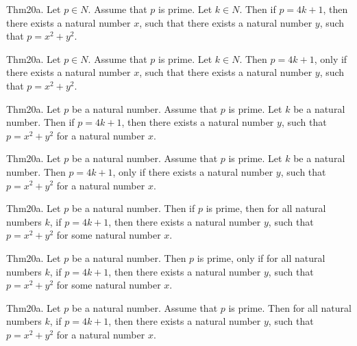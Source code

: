 \documentclass{article}
\begin{document}
Thm20a. Let $p \in N$. Assume that $p$ is prime. Let $k \in N$. Then if $p = 4 k + 1$, then there exists a natural number $x$, such that there exists a natural number $y$, such that $p = x ^{ 2}+ y ^{ 2}$.

Thm20a. Let $p \in N$. Assume that $p$ is prime. Let $k \in N$. Then $p = 4 k + 1$, only if there exists a natural number $x$, such that there exists a natural number $y$, such that $p = x ^{ 2}+ y ^{ 2}$.

Thm20a. Let $p$ be a natural number. Assume that $p$ is prime. Let $k$ be a natural number. Then if $p = 4 k + 1$, then there exists a natural number $y$, such that $p = x ^{ 2}+ y ^{ 2}$ for a natural number $x$.

Thm20a. Let $p$ be a natural number. Assume that $p$ is prime. Let $k$ be a natural number. Then $p = 4 k + 1$, only if there exists a natural number $y$, such that $p = x ^{ 2}+ y ^{ 2}$ for a natural number $x$.

Thm20a. Let $p$ be a natural number. Then if $p$ is prime, then for all natural numbers $k$, if $p = 4 k + 1$, then there exists a natural number $y$, such that $p = x ^{ 2}+ y ^{ 2}$ for some natural number $x$.

Thm20a. Let $p$ be a natural number. Then $p$ is prime, only if for all natural numbers $k$, if $p = 4 k + 1$, then there exists a natural number $y$, such that $p = x ^{ 2}+ y ^{ 2}$ for some natural number $x$.

Thm20a. Let $p$ be a natural number. Assume that $p$ is prime. Then for all natural numbers $k$, if $p = 4 k + 1$, then there exists a natural number $y$, such that $p = x ^{ 2}+ y ^{ 2}$ for a natural number $x$.
\end{document}
